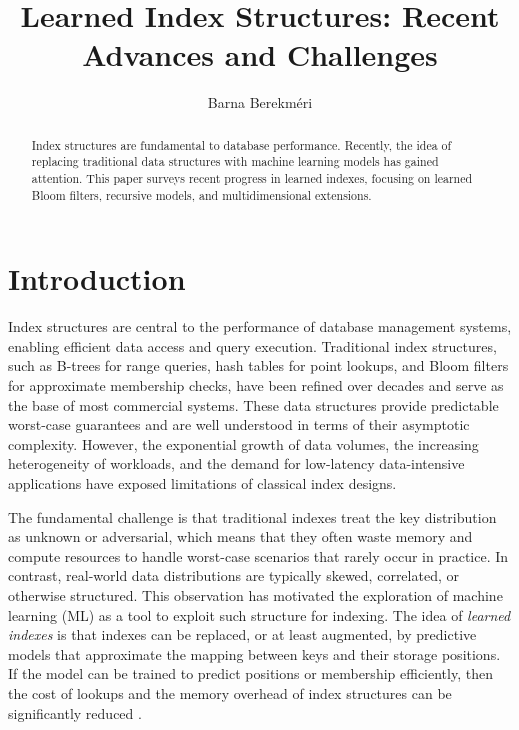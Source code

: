 \documentclass[sigconf]{acmart}
\title{Learned Index Structures: Recent Advances and Challenges}
\author{Barna Berekméri}
\affiliation{%
  \institution{Eötvös Loránd University (ELTE)}
  \city{Budapest}
  \country{Hungary}}
\begin{document}
\begin{abstract}
Index structures are fundamental to database performance. Recently, the
idea of replacing traditional data structures with machine learning
models has gained attention. This paper surveys recent progress in
learned indexes, focusing on learned Bloom filters, recursive models,
and multidimensional extensions.
\end{abstract}


\maketitle

\section{Introduction}

Index structures are central to the performance of database management
systems, enabling efficient data access and query execution.
Traditional index structures, such as B-trees for range queries,
hash tables for point lookups, and Bloom filters for approximate
membership checks, have been refined over decades and serve as the
base of most commercial systems. These data structures provide
predictable worst-case guarantees and are well understood in terms of
their asymptotic complexity. However, the exponential growth of data
volumes, the increasing heterogeneity of workloads, and the demand for
low-latency data-intensive applications have exposed limitations of
classical index designs.

The fundamental challenge is that traditional indexes treat the key
distribution as unknown or adversarial, which means that they often
waste memory and compute resources to handle worst-case scenarios that
rarely occur in practice. In contrast, real-world data distributions
are typically skewed, correlated, or otherwise structured. This
observation has motivated the exploration of machine learning (ML) as
a tool to exploit such structure for indexing. The idea of
\emph{learned indexes} is that indexes can be replaced, or at least
augmented, by predictive models that approximate the mapping between
keys and their storage positions. If the model can be trained to
predict positions or membership efficiently, then the cost of lookups
and the memory overhead of index structures can be significantly
reduced \cite{kraska2018case}.
\end{document}
